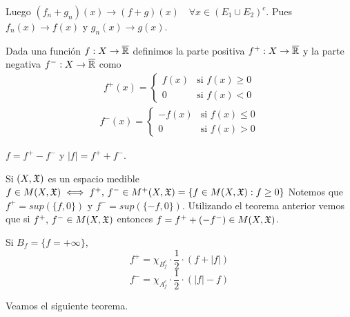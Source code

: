 Luego $(f_n + g_n)(x) \to (f+g)(x) \quad \forall x \in (E_1 \cup E_2)^c$. Pues $f_n(x) \to f(x)$ y $g_n(x) \to g(x)$.

\clearpage

\begin{definition}
    Dada una función $f : X \to \overline{\mathbb{R}}$ definimos la parte positiva $f^{+} : X \to \overline{\mathbb{R}}$ y la parte negativa $f^{-} : X \to \overline{\mathbb{R}}$ como
    \begin{align*}
        f^{+}(x) = \begin{cases}
                       f(x) & \text{si } f(x) \geq 0 \\
                       0    & \text{si } f(x) < 0
                   \end{cases}
    \end{align*}
    \begin{align*}
        f^{-}(x) = \begin{cases}
                       -f(x) & \text{si } f(x) \leq 0 \\
                       0     & \text{si } f(x) > 0
                   \end{cases}
    \end{align*}
\end{definition}

\begin{note}
    $f = f^{+} - f^{-}$ y $|f| = f^{+} + f^{-}$.
\end{note}

\begin{note}
    Si $(X, \mathfrak{X})$ es un espacio medible $f \in M(X, \mathfrak{X}) \iff f^{+} \text{, } f^{-} \in M^{+}(X, \mathfrak{X}) = \{ f \in M(X, \mathfrak{X}) : f \geq 0 \}$
    Notemos que $f^{+} = sup(\{ f, 0 \})$ y $f^{-} = sup(\{ -f, 0 \})$.
    Utilizando el teorema anterior vemos que si $f^{+} \text{, } f^{-} \in M(X, \mathfrak{X})$ entonces $f = f^{+} + (-f^{-}) \in M(X, \mathfrak{X})$.
\end{note}

\begin{note}
    Si $B_f = \{ f = +\infty \}$,
    \[ f^+ = \chi_{B_f^c} \cdot \frac{1}{2} \cdot (f + |f|) \]
    \[ f^- = \chi_{A_f^c} \cdot \frac{1}{2} \cdot (|f| - f) \]
\end{note}

\clearpage

Veamos el siguiente teorema.

